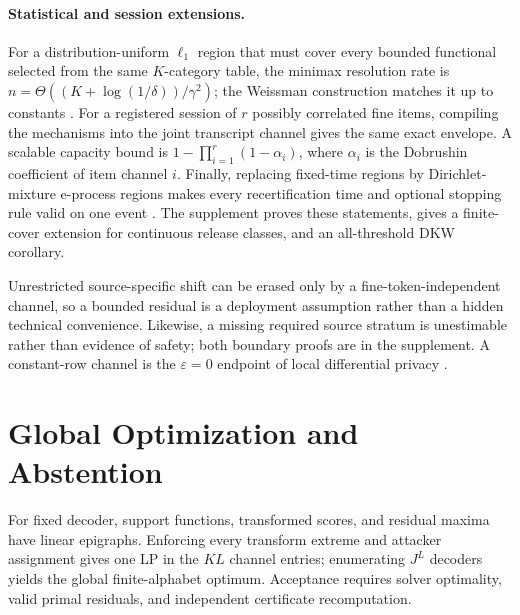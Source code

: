 \begin{center}
\end{center}

\paragraph{Statistical and session extensions.}
For a distribution-uniform $\ell_1$ region that must cover every bounded
functional selected from the same $K$-category table, the minimax resolution
rate is
$n=\Theta((K+\log(1/\delta))/\gamma^2)$; the Weissman construction matches it
up to constants \citep{han2015minimax}. For a registered session of $r$ possibly correlated fine
items, compiling the mechanisms into the joint transcript channel gives the
same exact envelope. A scalable capacity bound is
$1-\prod_{i=1}^r(1-\alpha_i)$, where $\alpha_i$ is the Dobrushin coefficient
of item channel $i$. Finally, replacing fixed-time regions by
Dirichlet-mixture e-process regions makes every recertification time and
optional stopping rule valid on one event \citep{ryu2024confidence}. The supplement proves these
statements, gives a finite-cover extension for continuous release classes, and
an all-threshold DKW corollary.

Unrestricted source-specific shift can be erased only by a fine-token-independent
channel, so a bounded residual is a deployment assumption rather than a hidden
technical convenience. Likewise, a missing required source stratum is
unestimable rather than evidence of safety; both boundary proofs are in the
supplement. A constant-row channel is the $\varepsilon=0$ endpoint of local
differential privacy \citep{warner1965randomized}.

\section{Global Optimization and Abstention}

For fixed decoder, support functions, transformed scores, and residual maxima
have linear epigraphs. Enforcing every transform extreme and attacker assignment
gives one LP in the $KL$ channel entries; enumerating $J^L$ decoders yields the
global finite-alphabet optimum. Acceptance requires solver optimality, valid
primal residuals, and independent certificate recomputation.

